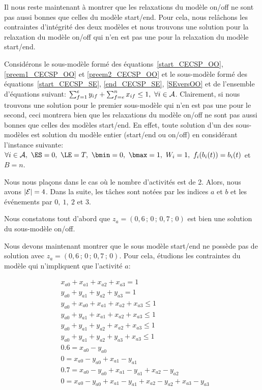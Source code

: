 Il nous reste maintenant à montrer que les relaxations du modèle
on/off ne sont pas aussi bonnes que celles du modèle start/end. Pour
cela, nous relâchons les contraintes d'intégrité des deux modèles et
nous trouvons une solution pour la relaxation du modèle on/off qui
n'en est pas une pour la relaxation du modèle start/end. 

Considérons le sous-modèle formé des
équations~\eqref{start_CECSP_OO}, \eqref{preem1_CECSP_OO} et
\eqref{preem2_CECSP_OO} et le sous-modèle formé des
équations~\eqref{start_CECSP_SE}, \eqref{end_CECSP_SE},
\eqref{SEversOO} et de l'ensemble d'équations suivant: $\sum_{f=1}^e
y_{if} +\sum_{f=e}^n x_{if}\le 1,\ \forall i \in {\cal A}$. Clairement, si
nous trouvons une solution pour le premier sous-modèle qui n'en est
pas une pour le second, ceci montrera bien que les relaxations du modèle
on/off ne sont pas aussi bonnes que celles des modèles start/end. En
effet, toute solution d'un des sous-modèles est solution du modèle
entier (start/end ou on/off) en considérant l'instance suivante:
$\forall i \in \A,\ \ES=0,\ \LE=T,\ \bmin=0,\ \bmax=1,\ W_i=1,\
f_i(b_i(t))=b_i(t)$ et $B=n$. 

Nous nous plaçons dans le cas où le nombre d'activités est de 2. Alors,
nous avons $|{\cal E}|=4$.  Dans la suite, les tâches sont notées par les
indices $a$ et $b$ et les événements par $0,\ 1,\ 2$ et $3$.

Nous constatons tout d'abord que $z_a=(0,6\,;\,0\,;\,0,7\,;\,0)$ est bien une
solution du sous-modèle on/off. 

Nous devons maintenant montrer que le sous modèle start/end ne possède
pas de solution avec $z_a=(0,6\,;\,0\,;\,0,7\,;\,0)$. Pour cela, étudions les contraintes du
modèle qui n'impliquent que l'activité $a$:

\begin{align} &x_{a0}+x_{a1}+x_{a2}+x_{a3}= 1 \label{c9}\\
              &y_{a0}+y_{a1}+y_{a2}+y_{a3}= 1 \label{c10}\\
              &y_{a0}+x_{a0}+x_{a1}+x_{a2}+x_{a3}\le1 \label{c11}\\
              &y_{a0}+y_{a1}+x_{a1}+x_{a2}+x_{a3}\le1 \label{c12}\\
              &y_{a0}+y_{a1}+y_{a2}+x_{a2}+x_{a3}\le1 \label{c13}\\
              &y_{a0}+y_{a1}+y_{a2}+y_{a3}+x_{a3}\le1 \label{c14}\\
              &0.6=x_{a0}-y_{a0}\label{c17}\\
              &0=x_{a0}-y_{a0}+x_{a1}-y_{a1}\label{c18}\\
              &0.7=x_{a0}-y_{a0}+x_{a1}-y_{a1}+x_{a2}-y_{a2}\label{c19}\\
              &0=x_{a0}-y_{a0}+x_{a1}-y_{a1}+x_{a2}-y_{a2}+x_{a3}-y_{a3}\label{c20}
\end{align}

